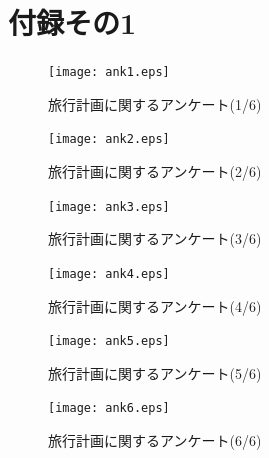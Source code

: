 \documentclass{funthesis}
\begin{document}
\chapter*{付録その1}

\begin{figure}[htpb]
\begin{center}
\texttt{[image: ank1.eps]}
\caption{旅行計画に関するアンケート(1/6)}
\end{center}
\end{figure}

\begin{figure}[htpb]
\begin{center}
\texttt{[image: ank2.eps]}
\caption{旅行計画に関するアンケート(2/6)}
\end{center}
\end{figure}

\begin{figure}[htpb]
\begin{center}
\texttt{[image: ank3.eps]}
\caption{旅行計画に関するアンケート(3/6)}
\end{center}
\end{figure}

\begin{figure}[htpb]
\begin{center}
\texttt{[image: ank4.eps]}
\caption{旅行計画に関するアンケート(4/6)}
\end{center}
\end{figure}

\begin{figure}[htpb]
\begin{center}
\texttt{[image: ank5.eps]}
\caption{旅行計画に関するアンケート(5/6)}
\end{center}
\end{figure}

\begin{figure}[htpb]
\begin{center}
\texttt{[image: ank6.eps]}
\caption{旅行計画に関するアンケート(6/6)}
\end{center}
\end{figure}



\listoffigures

\listoftables
\end{document}
